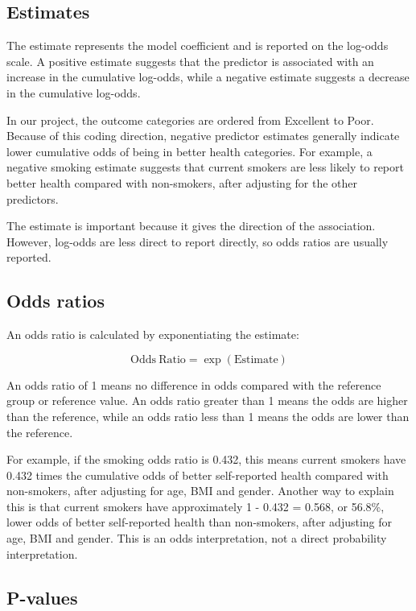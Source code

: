 \documentclass{article}
\begin{document}
\subsection{Estimates}\label{estimates}

The estimate represents the model coefficient and is reported on the
log-odds scale. A positive estimate suggests that the predictor is
associated with an increase in the cumulative log-odds, while a negative
estimate suggests a decrease in the cumulative log-odds.

In our project, the outcome categories are ordered from Excellent to
Poor. Because of this coding direction, negative predictor estimates
generally indicate lower cumulative odds of being in better health
categories. For example, a negative smoking estimate suggests that
current smokers are less likely to report better health compared with
non-smokers, after adjusting for the other predictors.

The estimate is important because it gives the direction of the
association. However, log-odds are less direct to report directly, so
odds ratios are usually reported.

\subsection{Odds ratios}\label{odds-ratios}

An odds ratio is calculated by exponentiating the estimate:

\[
\mathrm{Odds\ Ratio} = \exp(\mathrm{Estimate})
\]

An odds ratio of 1 means no difference in odds compared with the
reference group or reference value. An odds ratio greater than 1 means
the odds are higher than the reference, while an odds ratio less than 1
means the odds are lower than the reference.

For example, if the smoking odds ratio is 0.432, this means current
smokers have 0.432 times the cumulative odds of better self-reported
health compared with non-smokers, after adjusting for age, BMI and
gender. Another way to explain this is that current smokers have
approximately 1 - 0.432 = 0.568, or 56.8\%, lower odds of better
self-reported health than non-smokers, after adjusting for age, BMI and
gender. This is an odds interpretation, not a direct probability
interpretation.

\subsection{P-values}\label{p-values}
\end{document}
